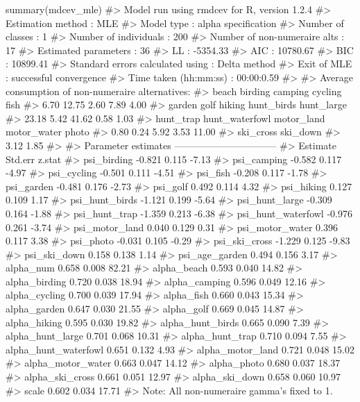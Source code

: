 \begin{example}
summary(mdcev_mle)
#> Model run using rmdcev for R, version 1.2.4 
#> Estimation method                : MLE
#> Model type                       : alpha specification
#> Number of classes                : 1
#> Number of individuals            : 200
#> Number of non-numeraire alts     : 17
#> Estimated parameters             : 36
#> LL                               : -5354.33
#> AIC                              : 10780.67
#> BIC                              : 10899.41
#> Standard errors calculated using : Delta method
#> Exit of MLE                      : successful convergence
#> Time taken (hh:mm:ss)            : 00:00:0.59
#> 
#> Average consumption of non-numeraire alternatives:
#>          beach        birding        camping        cycling           fish 
#>           6.70          12.75           2.60           7.89           4.00 
#>         garden           golf         hiking     hunt_birds     hunt_large 
#>          23.18           5.42          41.62           0.58           1.03 
#>      hunt_trap hunt_waterfowl     motor_land    motor_water          photo 
#>           0.80           0.24           5.92           3.53          11.00 
#>      ski_cross       ski_down 
#>           3.12           1.85 
#> 
#> Parameter estimates --------------------------------  
#>                      Estimate Std.err z.stat
#> psi_birding            -0.821   0.115  -7.13
#> psi_camping            -0.582   0.117  -4.97
#> psi_cycling            -0.501   0.111  -4.51
#> psi_fish               -0.208   0.117  -1.78
#> psi_garden             -0.481   0.176  -2.73
#> psi_golf                0.492   0.114   4.32
#> psi_hiking              0.127   0.109   1.17
#> psi_hunt_birds         -1.121   0.199  -5.64
#> psi_hunt_large         -0.309   0.164  -1.88
#> psi_hunt_trap          -1.359   0.213  -6.38
#> psi_hunt_waterfowl     -0.976   0.261  -3.74
#> psi_motor_land          0.040   0.129   0.31
#> psi_motor_water         0.396   0.117   3.38
#> psi_photo              -0.031   0.105  -0.29
#> psi_ski_cross          -1.229   0.125  -9.83
#> psi_ski_down            0.158   0.138   1.14
#> psi_age_garden          0.494   0.156   3.17
#> alpha_num               0.658   0.008  82.21
#> alpha_beach             0.593   0.040  14.82
#> alpha_birding           0.720   0.038  18.94
#> alpha_camping           0.596   0.049  12.16
#> alpha_cycling           0.700   0.039  17.94
#> alpha_fish              0.660   0.043  15.34
#> alpha_garden            0.647   0.030  21.55
#> alpha_golf              0.669   0.045  14.87
#> alpha_hiking            0.595   0.030  19.82
#> alpha_hunt_birds        0.665   0.090   7.39
#> alpha_hunt_large        0.701   0.068  10.31
#> alpha_hunt_trap         0.710   0.094   7.55
#> alpha_hunt_waterfowl    0.651   0.132   4.93
#> alpha_motor_land        0.721   0.048  15.02
#> alpha_motor_water       0.663   0.047  14.12
#> alpha_photo             0.680   0.037  18.37
#> alpha_ski_cross         0.661   0.051  12.97
#> alpha_ski_down          0.658   0.060  10.97
#> scale                   0.602   0.034  17.71
#> Note: All non-numeraire gamma's fixed to 1.
\end{example}

